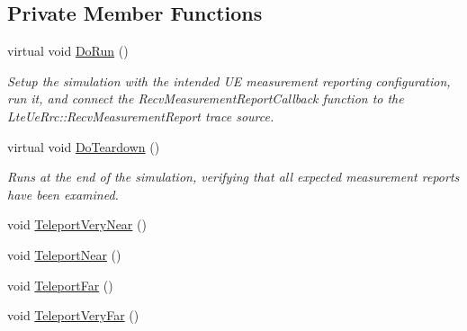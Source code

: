 \subsection*{Private Member Functions}
\begin{DoxyCompactItemize}
\item 
virtual void \hyperlink{classLteUeMeasurementsPiecewiseTestCase1_a76f2ad9d43e2fb22c37e4e8763296a5f}{Do\+Run} ()
\begin{DoxyCompactList}\small\item\em Setup the simulation with the intended UE measurement reporting configuration, run it, and connect the {\ttfamily Recv\+Measurement\+Report\+Callback} function to the {\ttfamily Lte\+Ue\+Rrc\+::\+Recv\+Measurement\+Report} trace source. \end{DoxyCompactList}\item 
virtual void \hyperlink{classLteUeMeasurementsPiecewiseTestCase1_a9e17d2e90add95437da32843ad702081}{Do\+Teardown} ()
\begin{DoxyCompactList}\small\item\em Runs at the end of the simulation, verifying that all expected measurement reports have been examined. \end{DoxyCompactList}\item 
void \hyperlink{classLteUeMeasurementsPiecewiseTestCase1_aa8faf751ec74daa2d3b81cb052a5e259}{Teleport\+Very\+Near} ()
\item 
void \hyperlink{classLteUeMeasurementsPiecewiseTestCase1_ab7723a343f65e8f7cd903392a809da02}{Teleport\+Near} ()
\item 
void \hyperlink{classLteUeMeasurementsPiecewiseTestCase1_a9194b43ac2606b5ba1cd3d70f7b60a7d}{Teleport\+Far} ()
\item 
void \hyperlink{classLteUeMeasurementsPiecewiseTestCase1_a2ccd01a6f426d9cc34b5322c596c7eab}{Teleport\+Very\+Far} ()
\end{DoxyCompactItemize}
